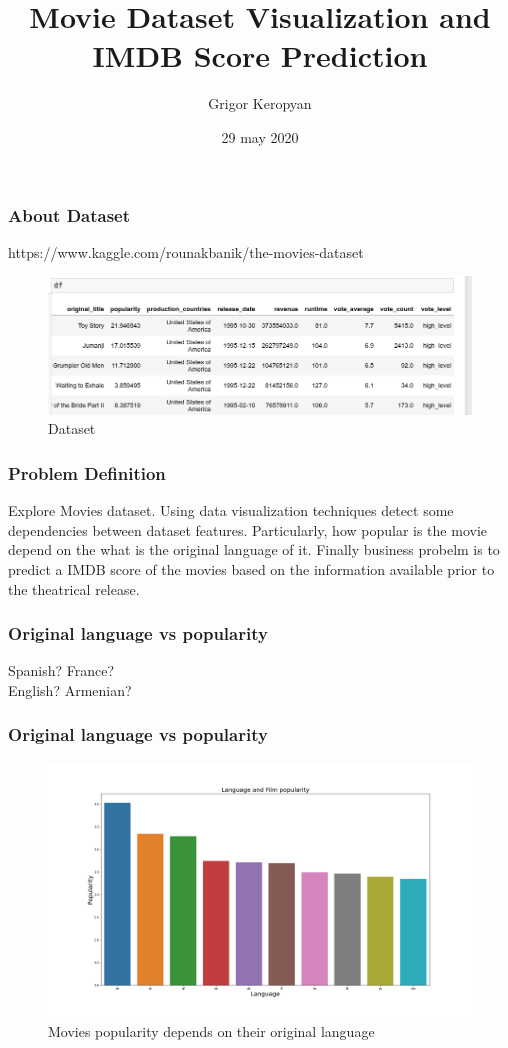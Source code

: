 \documentclass{beamer}
\title{Movie Dataset Visualization and IMDB Score Prediction}
\author[Grigor] %
{Grigor Keropyan\inst{1}}
\institute[YSU] %
{
	\inst{1}%
	Department of Mathematcis and Mechanics\\
	Yerevan State University
}
\date[2020] %
{29 may 2020}
\begin{document}
\frame{\titlepage}

\begin{frame}
\frametitle{About Dataset}

https://www.kaggle.com/rounakbanik/the-movies-dataset

\begin{figure}
	\centering
	\includegraphics[width=0.7\linewidth]{dataset}
	\caption{Dataset}
	\label{fig:dataset}
\end{figure}

\end{frame}

\begin{frame}
\frametitle{Problem Definition}

Explore Movies dataset. Using data visualization techniques detect some dependencies between dataset features. Particularly, how popular is the movie depend on the what is the original language of it. Finally business probelm is to predict a IMDB score of the movies based on the information available prior to the theatrical release. 

\end{frame}

\begin{frame}
\frametitle{Original language vs popularity}

Spanish? \newline
France? \\
English? \hfill \break
Armenian?


\end{frame}


\begin{frame}
\frametitle{Original language vs popularity}

\begin{figure}
	\centering
	\includegraphics[width=1\linewidth]{language_film_pop}
	\caption{Movies popularity depends on their original language}
	\label{fig:pop_vs_language}
	
\end{figure}

\end{frame}
\end{document}

